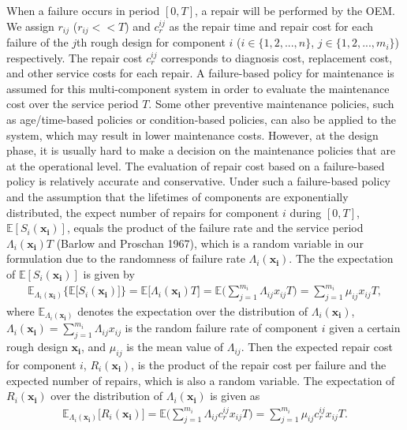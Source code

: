 \documentclass[preprint,12pt]{elsarticle}
\begin{document}
When a failure occurs in period $[0, T]$, a repair will be performed by the OEM. We assign $r_{ij}$ ($r_{ij}<<T$) and $c_r^{ij}$ as the repair time and repair cost for each failure of the $j$th rough design for component $i$ ($i \in \{1,2,...,n\}$, $j \in \{1,2,...,m_i\}$) respectively. The repair cost $c_r^{ij}$ corresponds to diagnosis cost, replacement cost, and other service costs for each repair. A failure-based policy for maintenance is assumed for this multi-component system in order to evaluate the maintenance cost over the service period $T$. Some other preventive maintenance policies, such as age/time-based policies or condition-based policies, can also be applied to the system, which may result in lower maintenance costs. However, at the design phase, it is usually hard to make a decision on the maintenance policies that are at the operational level. The evaluation of repair cost based on a failure-based policy is relatively accurate and conservative. Under such a failure-based policy and the assumption that the lifetimes of components are exponentially distributed, the expect number of repairs for component $i$ during $[0,T]$, $\mathbb{E}[S_{i}(\boldsymbol{x_{i}})]$, equals the product of the failure rate and the service period $\Lambda_i(\boldsymbol{x_{i}}) T$ (Barlow and Proschan 1967), which is a random variable in our formulation due to the randomness of failure rate $\Lambda_{i}(\boldsymbol{x_{i}})$. The the expectation of $\mathbb{E}[S_{i}(\boldsymbol{x_{i}})]$ is given by
\begin {eqnarray}
\mathbb{E}_{\Lambda_{i}(\boldsymbol{x_{i}})} \bigg\{ \mathbb{E}\bigg[S_{i}(\boldsymbol{x_{i}})\bigg] \bigg\}=\mathbb{E}\bigg[\Lambda_{i}(\boldsymbol{x_{i}})T\bigg] =\mathbb{E}\bigg(\sum_{j=1}^{m_{i}}{\Lambda_{ij}x_{ij}}T\bigg)=\sum_{j=1}^{m_{i}}{\mu_{ij}x_{ij}}T,
\end {eqnarray}
where $\mathbb{E}_{\Lambda_{i}(\boldsymbol{x_{i}})}$ denotes the expectation over the distribution of $\Lambda_{i}(\boldsymbol{x_{i}})$, $\Lambda_{i}(\boldsymbol{x_{i}})=\sum_{j=1}^{m_{i}}{\Lambda_{ij}x_{ij}}$ is the random failure rate of component $i$ given a certain rough design $\boldsymbol{x_i}$, and $\mu_{ij}$ is the mean value of $\Lambda_{ij}$. Then the expected repair cost for component $i$, $R_{i}(\boldsymbol{x_{i}})$, is the product of the repair cost per failure and the expected number of repairs, which is also a random variable. The expectation of $R_{i}(\boldsymbol{x_{i}})$ over the distribution of $\Lambda_i(\boldsymbol{x_{i}})$ is given as
\begin {eqnarray}
\mathbb{E}_{\Lambda_{i}(\boldsymbol{x_{i}})} \bigg[ R_{i}(\boldsymbol{x_{i}}) \bigg]=\mathbb{E}\bigg(\sum_{j=1}^{m_{i}}{\Lambda_{ij}c_r^{ij}x_{ij}}T\bigg)= \sum_{j=1}^{m_{i}}{\mu_{ij}c_r^{ij}x_{ij}}T.
\end {eqnarray}
\end{document}
